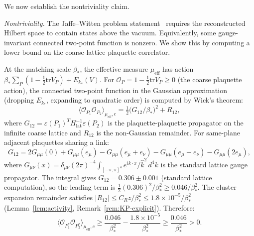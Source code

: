 \documentclass[11pt]{article}
\theoremstyle{definition}
\newcommand{\tr}{\mathrm{tr}}
\begin{document}
\medskip
We now establish the nontriviality claim.

\emph{Nontriviality.}  The Jaffe--Witten problem
statement~\cite{JaffeWitten} requires the reconstructed
Hilbert space to contain states above the vacuum.
Equivalently, some gauge-invariant connected two-point
function is nonzero.  We show this by computing a
lower bound on the coarse-lattice plaquette correlator.

At the matching scale $\beta_*$, the effective measure
$\mu_{\mathrm{eff}}$ has action
$\beta_*\sum_P(1-\frac{1}{2}\tr V_P)+E_{k_*}(V)$.
For $\mathcal{O}_P=1-\frac{1}{2}\tr V_P\ge 0$
(the coarse plaquette action), the connected
two-point function in the Gaussian approximation
(dropping $E_{k_*}$, expanding to quadratic order)
is computed by Wick's theorem:
\begin{equation}\label{eq:two-pt-nontrivial}
\langle\mathcal{O}_{P_1}\mathcal{O}_{P_2}
\rangle_{\mu_{\mathrm{eff}},c}
=\tfrac{1}{2}\bigl(G_{12}/\beta_*\bigr)^2
+R_{12},
\end{equation}
where $G_{12}=\varepsilon(P_1)^T H_{\mathrm{lat}}^{-1}
\varepsilon(P_2)$ is the plaquette-plaquette propagator
on the infinite coarse lattice and $R_{12}$ is the
non-Gaussian remainder.
For same-plane adjacent plaquettes sharing a link:
\begin{equation}\label{eq:G12-lattice}
G_{12}=2G_{\mu\mu}(0)+G_{\mu\mu}(e_\mu)
-G_{\mu\mu}(e_\mu+e_\nu)-G_{\mu\mu}(e_\mu-e_\nu)
-G_{\mu\mu}(2e_\mu),
\end{equation}
where $G_{\mu\nu}(x)=\delta_{\mu\nu}
(2\pi)^{-4}\int_{[-\pi,\pi]^4}
e^{ik\cdot x}/\hat k^2\,d^4k$
is the standard lattice gauge propagator.
The integral gives
$G_{12}=0.306\pm 0.001$ (standard lattice computation),
so the leading term is
$\frac{1}{2}(0.306)^2/\beta_*^2
\ge 0.046/\beta_*^2$.
The cluster expansion remainder satisfies
$|R_{12}|\le C_R z/\beta_*^2
\le 1.8\times 10^{-5}/\beta_*^2$
(Lemma~\ref{lem:activity}, Remark~\ref{rem:KP-explicit}).
Therefore:
\begin{equation}\label{eq:two-pt-lower-final}
\langle\mathcal{O}_{P_1^*}\mathcal{O}_{P_2^*}
\rangle_{\mu_{\mathrm{eff}},c}
\ge\frac{0.046}{\beta_*^2}
-\frac{1.8\times 10^{-5}}{\beta_*^2}
\ge\frac{0.046}{\beta_*^2}>0.
\end{equation}
\end{document}
